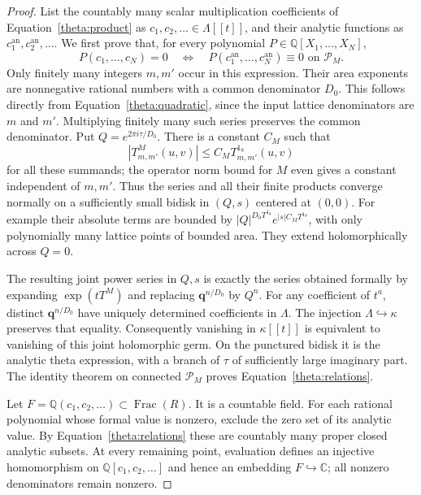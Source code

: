 \documentclass[11pt]{article}
\theoremstyle{definition}
\theoremstyle{remark}
\numberwithin{equation}{section}
\begin{document}
\begin{proof}
List the countably many scalar multiplication coefficients of
Equation~\eqref{theta:product} as $c_1,c_2,\ldots\in\Lambda[[t]]$,
and their analytic functions as $c_1^{\mathrm{an}},c_2^{\mathrm{an}},\ldots$.
We first prove that, for every polynomial $P\in\mathbb Q[X_1,\ldots,X_N]$,
\begin{equation}\label{theta:relations}
 P(c_1,\ldots,c_N)=0
 \quad\Longleftrightarrow\quad
 P(c_1^{\mathrm{an}},\ldots,c_N^{\mathrm{an}})\equiv0
       \text{ on }\mathcal P_M.
\end{equation}
Only finitely many integers $m,m'$ occur in this expression.
Their area exponents are nonnegative rational numbers with a common
denominator $D_0$.  This follows directly from
Equation~\eqref{theta:quadratic}, since the input lattice denominators
are $m$ and $m'$.  Multiplying finitely many such series preserves the
common denominator.  Put $Q=e^{2\pi i\tau/D_0}$.  There is a constant
$C_M$ such that
\[
 |T^M_{m,m'}(u,v)|\leq C_M T^{1_8}_{m,m'}(u,v)
\]
for all these summands; the operator norm bound for $M$ even gives a
constant independent of $m,m'$.  Thus the series and all their finite
products converge normally on a sufficiently small bidisk in $(Q,s)$
centered at $(0,0)$.  For example their absolute terms are bounded by
$|Q|^{D_0T^{1_8}}e^{|s|C_MT^{1_8}}$, with only polynomially many lattice
points of bounded area.  They extend holomorphically across $Q=0$.

The resulting joint power series in $Q,s$ is exactly the series obtained
formally by expanding $\exp(tT^M)$ and replacing
$\mathbf q^{n/D_0}$ by $Q^n$.  For any coefficient of $t^a$, distinct
$\mathbf q^{n/D_0}$ have uniquely determined coefficients in $\Lambda$.
The injection $\Lambda\hookrightarrow\kappa$ preserves that equality.
Consequently vanishing in $\kappa[[t]]$ is equivalent to vanishing of
this joint holomorphic germ.  On the punctured bidisk it is the analytic
theta expression, with a branch of $\tau$ of sufficiently large imaginary
part.  The identity theorem on connected $\mathcal P_M$ proves
Equation~\eqref{theta:relations}.

Let $F=\mathbb Q(c_1,c_2,\ldots)\subset\operatorname{Frac}(R)$.  It is a
countable field.  For each rational polynomial whose formal value is
nonzero, exclude the zero set of its analytic value.  By
Equation~\eqref{theta:relations} these are countably many proper closed
analytic subsets.  At every remaining point, evaluation defines an
injective homomorphism on $\mathbb Q[c_1,c_2,\ldots]$ and hence an embedding
$F\hookrightarrow\mathbb C$; all nonzero denominators remain nonzero.


\end{proof}
\end{document}
